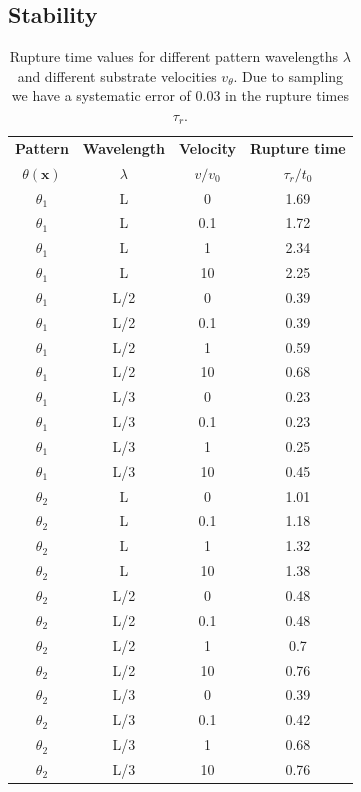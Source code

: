 \documentclass[twocolumn,amsmath,amssymb,showpacs,pre,nofootinbib,superscriptaddress]{revtex4-1} %
\begin{document}
\subsection{Stability}\label{subsec:time_dep_theta}
\begin{table}[h!]
  \begin{center}
    \begin{tabular}{c|c|c|c}
      \textbf{Pattern} & \textbf{Wavelength} & \textbf{Velocity } & \textbf{Rupture time}\\
      $\theta(\mathbf{x})$ & $\lambda$ & $v/v_0 $ & $\tau_r/t_0$ \\
      \hline
      $\theta_1$ & L & 0 & 1.69\\
      $\theta_1$ & L & 0.1 & 1.72\\
      $\theta_1$ & L & 1 & 2.34\\
      $\theta_1$ & L & 10 & 2.25\\
      $\theta_1$ & L/2 & 0 & 0.39\\
      $\theta_1$ & L/2 & 0.1 & 0.39\\
      $\theta_1$ & L/2 & 1 & 0.59\\
      $\theta_1$ & L/2 & 10 & 0.68\\
      $\theta_1$ & L/3 & 0 & 0.23\\
      $\theta_1$ & L/3 & 0.1 & 0.23\\
      $\theta_1$ & L/3 & 1 & 0.25\\
      $\theta_1$ & L/3 & 10 & 0.45\\
      $\theta_2$ & L & 0 & 1.01\\
      $\theta_2$ & L & 0.1 & 1.18\\
      $\theta_2$ & L & 1 & 1.32\\
      $\theta_2$ & L & 10 & 1.38\\
      $\theta_2$ & L/2 & 0 & 0.48\\
      $\theta_2$ & L/2 & 0.1 & 0.48\\
      $\theta_2$ & L/2 & 1 & 0.7\\
      $\theta_2$ & L/2 & 10 & 0.76\\
      $\theta_2$ & L/3 & 0 & 0.39\\
      $\theta_2$ & L/3 & 0.1 & 0.42\\
      $\theta_2$ & L/3 & 1 & 0.68\\
      $\theta_2$ & L/3 & 10 & 0.76\\
    \end{tabular}
    \caption{Rupture time values for different pattern wavelengths $\lambda$ and different substrate velocities $v_{\theta}$.
    Due to sampling we have a systematic error of 0.03 in the rupture times $\tau_r$.}
    \label{tab:rup_times}
  \end{center}
\end{table}
\end{document}

